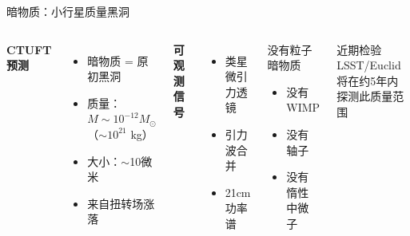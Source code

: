 \documentclass[aspectratio=169]{beamer}
\begin{document}
\begin{frame}{暗物质：小行星质量黑洞}
\begin{columns}
\textbf{CTUFT预测}
\begin{itemize}
    \item 暗物质 = 原初黑洞
    \item 质量：$M \sim 10^{-12} M_\odot$（$\sim 10^{21}$ kg）
    \item 大小：$\sim$10微米
    \item 来自扭转场涨落
\end{itemize}

\vspace{0.5cm}

\textbf{可观测信号}
\begin{itemize}
    \item 类星微引力透镜
    \item 引力波合并
    \item 21cm功率谱
\end{itemize}

\begin{block}{没有粒子暗物质}
\begin{itemize}
    \item 没有WIMP
    \item 没有轴子
    \item 没有惰性中微子
\end{itemize}
\end{block}

\begin{alertblock}{近期检验}
LSST/Euclid将在约5年内探测此质量范围
\end{alertblock}
\end{columns}
\end{frame}
\end{document}
